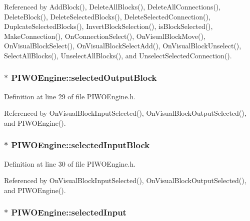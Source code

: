 Referenced by AddBlock(), DeleteAllBlocks(), DeleteAllConnections(), DeleteBlock(), DeleteSelectedBlocks(), DeleteSelectedConnection(), DuplcateSelectedBlocks(), InvertBlockSelection(), isBlockSelected(), MakeConnection(), OnConnectionSelect(), OnVisualBlockMove(), OnVisualBlockSelect(), OnVisualBlockSelectAdd(), OnVisualBlockUnselect(), SelectAllBlocks(), UnselectAllBlocks(), and UnselectSelectedConnection().\hypertarget{classPIWOEngine_573250b25797190affc38e1e3fdf8bf3}{
\subsubsection[selectedOutputBlock]{$\ast$ {\bf PIWOEngine::selectedOutputBlock}}}
\label{classPIWOEngine_573250b25797190affc38e1e3fdf8bf3}




Definition at line 29 of file PIWOEngine.h.

Referenced by OnVisualBlockInputSelected(), OnVisualBlockOutputSelected(), and PIWOEngine().\hypertarget{classPIWOEngine_9fe3dcb62ef1ef7860afe06ddca01585}{
\subsubsection[selectedInputBlock]{$\ast$ {\bf PIWOEngine::selectedInputBlock}}}
\label{classPIWOEngine_9fe3dcb62ef1ef7860afe06ddca01585}




Definition at line 30 of file PIWOEngine.h.

Referenced by OnVisualBlockInputSelected(), OnVisualBlockOutputSelected(), and PIWOEngine().\hypertarget{classPIWOEngine_87ae251a3b1c318e8c26e85396fde9e9}{
\subsubsection[selectedInput]{$\ast$ {\bf PIWOEngine::selectedInput}}}
\label{classPIWOEngine_87ae251a3b1c318e8c26e85396fde9e9}




